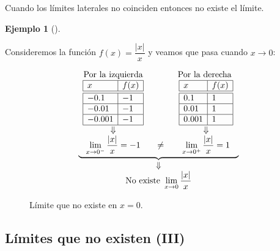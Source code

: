 \documentclass[
  a4paper,
]{scrreport}
\theoremstyle{plain}
\theoremstyle{plain}
\theoremstyle{definition}
\theoremstyle{plain}
\theoremstyle{definition}
\newtheorem{example}{Ejemplo}[chapter]
\theoremstyle{remark}
\begin{document}
Cuando los límites laterales no coinciden entonces no existe el límite.

\leavevmode{}%
\begin{example}[]\label{exm-limites-no-existen-2}

Consideremos la función \(f(x)=\dfrac{\lvert x\rvert}{x}\) y veamos que
pasa cuando \(x\to 0\):

\[\begin{array}{c}
\underbrace{\begin{array}{ccc}
\textrm{Por la izquierda} & \qquad & \textrm{Por la derecha }\\
\begin{array}{|l|l|}
\hline
x      & f(x)   \\
\hline\hline
 -0.1   & -1       \\
\hline
 -0.01   & -1     \\
\hline
 -0.001  & -1   \\
\hline
\end{array}
& &
\begin{array}{|l|l|}
\hline
x      & f(x)   \\
\hline\hline
 0.1    & 1       \\
\hline
 0.01   & 1    \\
\hline
 0.001  & 1   \\
\hline
\end{array}\\
\Downarrow & & \Downarrow\\
\displaystyle \lim_{x\to 0^-}\frac{|x|}{x}=-1
&\neq &
\displaystyle \lim_{x\to 0^+}\frac{|x|}{x}=1
\end{array}}\\
\Downarrow\\
\displaystyle \textrm{No existe }\lim_{x\to 0}\frac{|x|}{x}
\end{array}
\]

\begin{figure}

{\centering 



}

\caption{Límite que no existe en \(x=0\).}

\end{figure}

\end{example}

\hypertarget{luxedmites-que-no-existen-iii}{%
\subsection{Límites que no existen
(III)}\label{luxedmites-que-no-existen-iii}}
\end{document}
